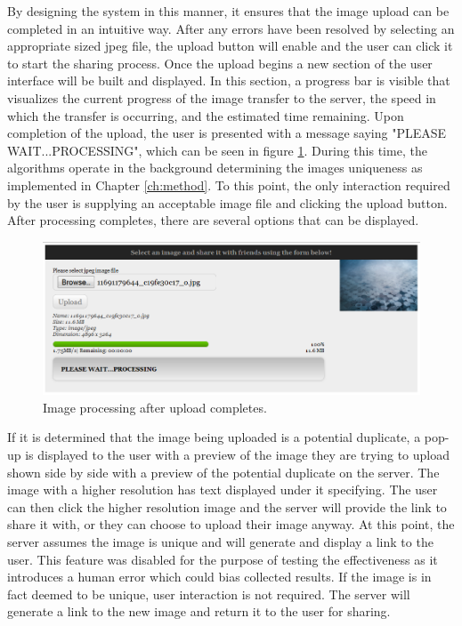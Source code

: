 By designing the system in this manner, it ensures that the image upload can be completed in an intuitive way. After any errors have been resolved by selecting an appropriate sized jpeg file, the upload button will enable and the user can click it to start the sharing process. Once the upload begins a new section of the user interface will be built and displayed. In this section, a progress bar is visible that visualizes the current progress of the image transfer to the server, the speed in which the transfer is occurring, and the estimated time remaining. Upon completion of the upload, the user is presented with a message saying "PLEASE WAIT...PROCESSING", which can be seen in figure \ref{fig:imageprocessing}. During this time, the algorithms operate in the background determining the images uniqueness as implemented in Chapter \ref{ch:method}. To this point, the only interaction required by the user is supplying an acceptable image file and clicking the upload button. After processing completes, there are several options that can be displayed.

\begin{figure}[htbp]
\centering
\includegraphics[width=6in]{imageprocessing}
\caption{Image processing after upload completes.}
\label{fig:imageprocessing}
\end{figure}

If it is determined that the image being uploaded is a potential duplicate, a pop-up is displayed to the user with a preview of the image they are trying to upload shown side by side with a preview of the potential duplicate on the server. The image with a higher resolution has text displayed under it specifying. The user can then click the higher resolution image and the server will provide the link to share it with, or they can choose to upload their image anyway. At this point, the server assumes the image is unique and will generate and display a link to the user. This feature was disabled for the purpose of testing the effectiveness as it introduces a human error which could bias collected results. If the image is in fact deemed to be unique, user interaction is not required. The server will generate a link to the new image and return it to the user for sharing.

